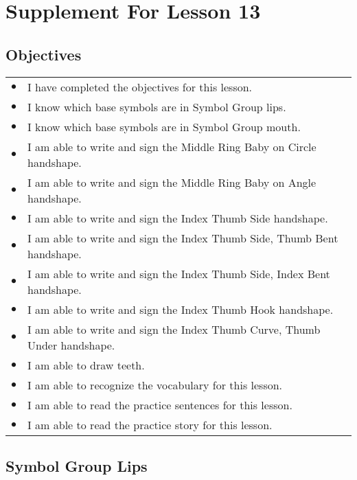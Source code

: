 \documentclass{article}
\begin{document}
\newfontfamily{}
\newfontfamily{}
\newcommand{\bul}{\hfil$\bullet$&}
\renewenvironment{glossary}{\begin{multicols}{5}\begin{center}}{\end{center}\end{multicols}}
\setcounter{secnumdepth}{0}
\setlength{\columnseprule}{1pt}

\section{Supplement For Lesson 13}

\subsection{Objectives}

\begin{tabular}{p{1cm}p{14cm}}
\bul I have completed the objectives for this lesson.\\
\bul I know which base symbols are in Symbol Group lips.\\
\bul I know which base symbols are in Symbol Group mouth.\\
\bul I am able to write and sign the Middle Ring Baby on Circle handshape.\\
\bul I am able to write and sign the Middle Ring Baby on Angle handshape.\\
\bul I am able to write and sign the Index Thumb Side handshape.\\
\bul I am able to write and sign the Index Thumb Side, Thumb Bent handshape.\\
\bul I am able to write and sign the Index Thumb Side, Index Bent handshape.\\
\bul I am able to write and sign the Index Thumb Hook handshape.\\
\bul I am able to write and sign the Index Thumb Curve, Thumb Under handshape.\\
\bul I am able to draw teeth.\\
\bul I am able to recognize the vocabulary for this lesson.\\
\bul I am able to read the practice sentences for this lesson.\\
\bul I am able to read the practice story for this lesson.\\
\end{tabular}

\subsection{Symbol Group Lips}
\end{document}

